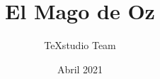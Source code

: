 \documentclass[a4paper,12pt]{book}
\begin{document}
\author{TeXstudio Team}
\title{El Mago de Oz}
\date{Abril 2021}

\frontmatter
\maketitle
\tableofcontents

\mainmatter













\backmatter
\end{document}
